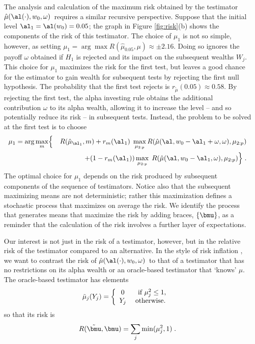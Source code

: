 \documentclass[12pt]{article}
\newcommand{\test}{\mbox{$\hat\mu(\al(\cdot),w_0,\omega)$}}
\begin{document}
 The analysis and calculation of the maximum risk obtained by the testimator
 \test\ requires a similar recursive perspective.  Suppose that the initial
 level $\al_1 = \al(w_0)=0.05$; the graph in Figure \ref{fig:risk}(b) shows the
 components of the risk of this testimator.  The choice of $\mu_1$ is not so
 simple, however, as setting $\mu_1 = \arg \max R(\hat\mu_{0.05},\mu) \approx
 \pm 2.16$.  Doing so ignores the payoff $\omega$ obtained if $H_1$ is rejected
 and its impact on the subsequent wealths $W_j$.  This choice for $\mu_1$
 maximizes the risk for the first test, but leaves a good chance for the
 estimator to gain wealth for subsequent tests by rejecting the first null
 hypothesis.  The probability that the first test rejects is
 $r_{\tilde\mu}(0.05) \approx 0.58$.  By rejecting the first test, the alpha
 investing rule obtains the additional contribution $\omega$ to its alpha
 wealth, allowing it to increase the level -- and so potentially reduce its risk
 -- in subsequent tests.  Instead, the problem to be solved at the first test is
 to choose
 \begin{eqnarray*}
    \mu_1 = \arg \max_{m} & \Bigl\{ & R(\hat\mu_{\al_1},m) \Bigr. 
        + r_{m}(\al_1) \; \max_{\mu_{2:p}} 
              R(\hat\mu(\al,w_0-\al_1+\omega,\omega),\mu_{2:p})\cr
    & & + \Bigl. (1-r_{m}(\al_1)) \max_{\mu_{2:p}} \; 
              R(\hat\mu(\al,w_0-\al_1,\omega),\mu_{2:p}) \Bigr\} \;.
 \end{eqnarray*}
 The optimal choice for $\mu_1$ depends on the risk produced by subsequent
 components of the sequence of testimators.  Notice also that the subsequent
 maximizing means are not deterministic; rather this maximization defines a
 stochastic process that maximizes on average the risk.  We identify the process
 that generates means that maximize the risk by adding braces, $\{\bmu\}$, as a
 reminder that the calculation of the risk involves a further layer of
 expectations.  


 Our interest is not just in the risk of a testimator, however, but in the
 relative risk of the testimator compared to an alternative.  In the style of
 risk inflation , we want to contrast the risk of \test\ to that of a
 testimator that has no restrictions on its alpha wealth or an oracle-based
 testimator that `knows' $\mu$.  The oracle-based testimator has elements
 \begin{equation}
   \tilde\mu_j(Y_j) = \left\{ \begin{array}{cc} 
                       0    & \mbox{ if } \mu_j^2 \le 1,        \cr
                       Y_j  & \mbox{ otherwise. }
                \end{array} \right.
 \label{eq:muTilde}
 \end{equation}
 so that its risk is 
 \begin{equation}
    R(\tilde{\bmu},\bmu) = \sum_j \min(\mu_j^2,1) \;.   
 \label{eq:riskMuTilde}
 \end{equation}
\end{document}
